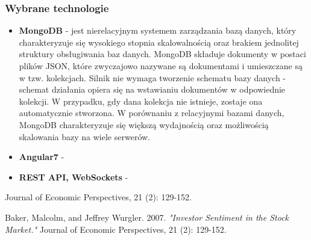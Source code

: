 \subsubsection{Wybrane technologie}
\begin{itemize}
    \item {\textbf{MongoDB} - jest nierelacyjnym systemem zarządzania bazą danych, który charakteryzuje się wysokiego stopnia skalowalnością oraz brakiem jednolitej struktury obsługiwania baz danych. MongoDB składuje dokumenty w postaci plików JSON, które zwyczajowo nazywane są dokumentami i umieszczane są w tzw. kolekcjach. Silnik nie wymaga tworzenie schematu bazy danych - schemat działania opiera się na wstawianiu dokumentów w odpowiednie kolekcji. W przypadku, gdy dana kolekcja nie istnieje, zostaje ona automatycznie stworzona. W porównaniu z relacyjnymi bazami danych, MongoDB charakteryzuje się większą wydajnością oraz możliwością skalowania bazy na wiele serwerów.}
    \item {\textbf{Angular7} - }
    \item {\textbf{REST API, WebSockets} - }
\end{itemize} Journal of Economic Perspectives, 21 (2): 129-152.

\begin{thebibliography}{9}
Baker, Malcolm, and Jeffrey Wurgler. 2007. 
\textit{"Investor Sentiment in the Stock Market."}
 Journal of Economic Perspectives, 21 (2): 129-152.
\end{thebibliography}
